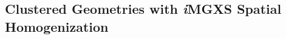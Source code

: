 \begin{appendices}
%
%
%
%
%


\chapter{Clustered Geometries with \textit{i}MGXS Spatial Homogenization}
\label{sec:clustered-geometries}


\end{appendices}
